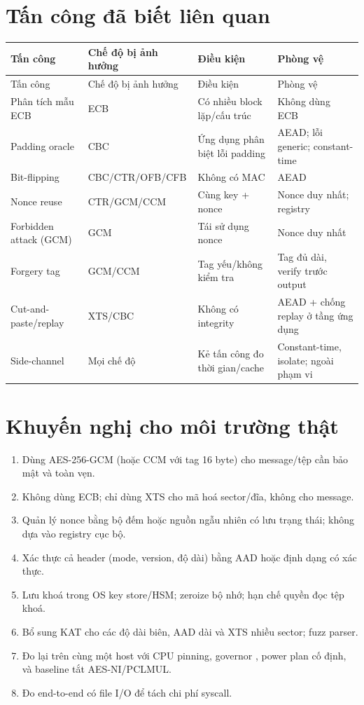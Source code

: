 \documentclass[12pt,a4paper,oneside]{report}
\let\origtexttt\texttt
\renewcommand{\texttt}[1]{\origtexttt{\seqsplit{#1}}}
\begin{document}
\section{Tấn công đã biết liên quan}


\begin{longtable}{p{}p{}p{}p{}}
\toprule
Tấn công & Chế độ bị ảnh hưởng & Điều kiện & Phòng vệ \\
\midrule
\endfirsthead
\toprule
Tấn công & Chế độ bị ảnh hưởng & Điều kiện & Phòng vệ \\
\midrule
\endhead
Phân tích mẫu ECB & ECB & Có nhiều block lặp/cấu trúc & Không dùng ECB \\
Padding oracle & CBC & Ứng dụng phân biệt lỗi padding & AEAD; lỗi generic; constant-time \\
Bit-flipping & CBC/CTR/OFB/CFB & Không có MAC & AEAD \\
Nonce reuse & CTR/GCM/CCM & Cùng key + nonce & Nonce duy nhất; registry \\
Forbidden attack (GCM) & GCM & Tái sử dụng nonce & Nonce duy nhất \\
Forgery tag & GCM/CCM & Tag yếu/không kiểm tra & Tag đủ dài, verify trước output \\
Cut-and-paste/replay & XTS/CBC & Không có integrity & AEAD + chống replay ở tầng ứng dụng \\
Side-channel & Mọi chế độ & Kẻ tấn công đo thời gian/cache & Constant-time, isolate; ngoài phạm vi \\
\bottomrule
\end{longtable}


\section{Khuyến nghị cho môi trường thật}


\begin{enumerate}[leftmargin=*]
\item Dùng AES-256-GCM (hoặc CCM với tag 16 byte) cho message/tệp cần bảo mật và toàn vẹn.
\item Không dùng ECB; chỉ dùng XTS cho mã hoá sector/đĩa, không cho message.
\item Quản lý nonce bằng bộ đếm hoặc nguồn ngẫu nhiên có lưu trạng thái; không dựa vào registry cục bộ.
\item Xác thực cả header (mode, version, độ dài) bằng AAD hoặc định dạng có xác thực.
\item Lưu khoá trong OS key store/HSM; zeroize bộ nhớ; hạn chế quyền đọc tệp khoá.
\item Bổ sung KAT cho các độ dài biên, AAD dài và XTS nhiều sector; fuzz parser.
\item Đo lại trên cùng một host với CPU pinning, governor \texttt{performance}, power plan cố định, và baseline tắt AES-NI/PCLMUL.
\item Đo end-to-end có file I/O để tách chi phí syscall.
\end{enumerate}
\end{document}
